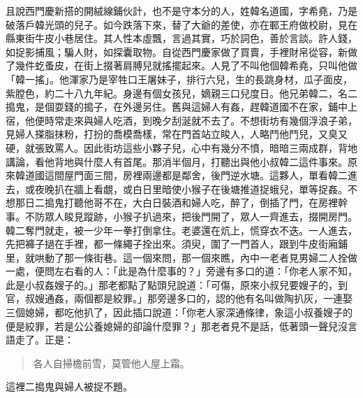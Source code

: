 且說西門慶新搭的開絨線鋪伙計，也不是守本分的人，姓韓名道國，字希堯，乃是破落戶韓光頭的兒子。如今跌落下來，替了大爺的差使，亦在鄆王府做校尉，見在縣東街牛皮小巷居住。其人性本虛飄，言過其實，巧於詞色，善於言談。許人錢，如捉影捕風；騙人財，如探囊取物。自從西門慶家做了買賣，手裡財帛從容，新做了幾件虼蚤皮，在街上掇著肩膊兒就搖擺起來。人見了不叫他個韓希堯，只叫他做「韓一搖」。他渾家乃是宰牲口王屠妹子，排行六兒，生的長跳身材，瓜子面皮，紫膛色，約二十八九年紀。身邊有個女孩兒，嫡親三口兒度日。他兄弟韓二，名二搗鬼，是個耍錢的搗子，在外邊另住。舊與這婦人有姦，趕韓道國不在家，鋪中上宿，他便時常走來與婦人吃酒，到晚夕刮涎就不去了。不想街坊有幾個浮浪子弟，見婦人搽脂抹粉，打扮的喬模喬樣，常在門首站立睃人，人略鬥他鬥兒，又臭又硬，就張致罵人。因此街坊這些小夥子兒，心中有幾分不憤，暗暗三兩成群，背地講論，看他背地與什麼人有首尾。那消半個月，打聽出與他小叔韓二這件事來。原來韓道國這間屋門面三間，房裡兩邊都是鄰舍，後門逆水塘。這夥人，單看韓二進去，或夜晚扒在牆上看覷，或白日里暗使小猴子在後塘推道捉蛾兒，單等捉姦。不想那日二搗鬼打聽他哥不在，大白日裝酒和婦人吃，醉了，倒插了門，在房裡幹事。不防眾人睃見蹤跡，小猴子扒過來，把後門開了，眾人一齊進去，掇開房門。韓二奪門就走，被一少年一拳打倒拿住。老婆還在炕上，慌穿衣不迭。一人進去，先把褲子撾在手裡，都一條繩子拴出來。須臾，圍了一門首人，跟到牛皮街廂鋪里，就哄動了那一條街巷。這一個來問，那一個來瞧，內中一老者見男婦二人拴做一處，便問左右看的人：「此是為什麼事的？」旁邊有多口的道：「你老人家不知，此是小叔姦嫂子的。」那老都點了點頭兒說道：「可傷，原來小叔兒要嫂子的，到官，叔嫂通姦，兩個都是絞罪。」那旁邊多口的，認的他有名叫做陶扒灰，一連娶三個媳婦，都吃他扒了，因此插口說道：「你老人家深通條律，象這小叔養嫂子的便是絞罪，若是公公養媳婦的卻論什麼罪？」那老者見不是話，低著頭一聲兒沒言語走了。正是：
\begin{quote}
各人自掃檐前雪，莫管他人屋上霜。
\end{quote}
這裡二搗鬼與婦人被捉不題。

